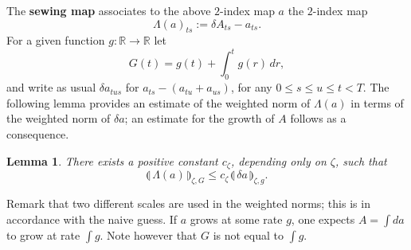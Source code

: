 \documentclass[11pt,a4paper]{amsart}
\newcommand{\RR}{\mathbb{R}}  \newcommand{\CC}{\mathbb{C}}  \newcommand{\LL}{\mathbb{L}}  \newcommand{\WW}{\mathbb{W}}
\renewcommand{\leq}{\leqslant}
\newcommand{\ssk}{\smallskip}
\newtheorem{lem}[thm]{\hspace{-0.15cm}  {\sc Lemma} }%
\numberwithin{equation}{section} %
\begin{document}
\ssk

The \textbf{sewing map} associates to the above $2$-index map $a$ the $2$-index map
$$
\Lambda(a)_{ts} := \delta A_{ts} - a_{ts}.
$$
For a given function $g:\RR\to\RR$ let 
$$
G(t) = g(t) + \int_0^t g(r)\,dr,
$$
and write as usual  $\delta a_{tus}$ for $a_{ts} - (a_{tu}+a_{us})$, for any $0\leq s\leq u\leq t<T$. The following lemma provides an estimate of the weighted norm of $\Lambda(a)$ in terms of the weighted norm of $\delta a$; an estimate for the growth of $A$ follows as a consequence. 

\begin{lem}
\label{LemmaSewingMap}
There exists a positive constant $c_\zeta$, depending only on $\zeta$, such that 
$$
\llparenthesis\,\Lambda(a)\,\rrparenthesis_{\zeta,G} \leq c_\zeta \, \llparenthesis\,\delta a\,\rrparenthesis_{\zeta,g}.
$$
\end{lem}

Remark that two different scales are used in the weighted norms; this is in accordance with the naive guess. If $a$ grows at some rate $g$, one expects $A = \int da$ to grow at rate $\int g$. Note however that $G$ is not equal to $\int g$.

\medskip
\end{document}
